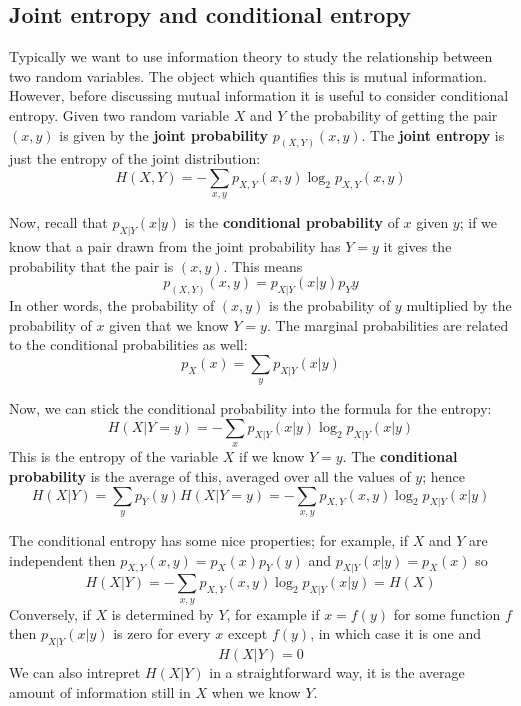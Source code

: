 \documentclass[12pt]{article}
\begin{document}
\subsection*{Joint entropy and conditional entropy}

Typically we want to use information theory to study the relationship
between two random variables. The object which quantifies this is
mutual information. However, before discussing mutual information it
is useful to consider conditional entropy. Given two random variable
$X$ and $Y$ the probability of getting the pair $(x,y)$ is given by
the \textbf{joint probability} $p_{(X,Y)}(x,y)$. The \textbf{joint
  entropy} is just the entropy of the joint distribution:
\begin{equation}
H(X,Y)=-\sum_{x,y}p_{X,Y}(x,y)\log_2{p_{X,Y}(x,y)}
\end{equation}

Now, recall that
$p_{X|Y}(x|y)$ is the \textbf{conditional probability} of $x$ given $y$; if we
know that a pair drawn from the joint probability has $Y=y$ it gives
the probability that the pair is $(x,y)$. This means
\begin{equation}
p_{(X,Y)}(x,y)=p_{X|Y}(x|y)p_Y{y}
\end{equation}
In other words, the probability of $(x,y)$ is the probability of $y$
multiplied by the probability of $x$ given that we know $Y=y$. The
marginal probabilities are related to the conditional probabilities as
well:
\begin{equation}
p_X(x)=\sum_y p_{X|Y}(x|y)
\end{equation}

Now, we can stick the conditional probability into the formula for the entropy:
\begin{equation}
H(X|Y=y)=-\sum_{x} p_{X|Y}(x|y)\log_2{p_{X|Y}(x|y)}
\end{equation}
This is the entropy of the variable $X$ if we know $Y=y$. The \textbf{conditional probability} is the average of this, averaged over all the values of $y$; hence
\begin{equation}
H(X|Y)=\sum_y p_Y(y) H(X|Y=y)=-\sum_{x,y}p_{X,Y}(x,y)\log_2{p_{X|Y}(x|y)}
\end{equation}

The conditional entropy has some nice properties; for example, if $X$
and $Y$ are independent then $p_{X,Y}(x,y)=p_X(x)p_Y(y)$ and
$p_{X|Y}(x|y)=p_X(x)$ so
\begin{equation}
H(X|Y)=-\sum_{x,y}p_{X,Y}(x,y)\log_2{p_{X|Y}(x|y)}=H(X)
\end{equation}
Conversely, if $X$ is determined by $Y$, for example if $x=f(y)$ for
some function $f$ then $p_{X|Y}(x|y)$ is zero for every $x$ except
$f(y)$, in which case it is one and
\begin{equation}
H(X|Y)=0
\end{equation}
We can also intrepret $H(X|Y)$ in a straightforward way, it is the
average amount of information still in $X$ when we know $Y$.
\end{document}
